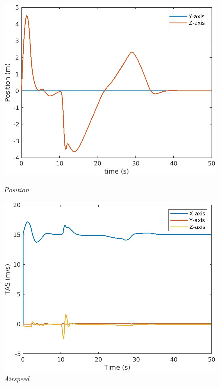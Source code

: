 \begin{figure}[htbp]
  \centering
  \begin{minipage}[b]{0.45\textwidth}
    \centering
    \includegraphics[width=\textwidth]{Images/Control Surface Analysis/1 position_1.jpg}
    \caption*{\textit{Position}}
  \end{minipage}
  \hfil
  \begin{minipage}[b]{0.45\textwidth}
    \centering
    \includegraphics[width=\textwidth]{Images/Control Surface Analysis/2 TAS_1.jpg}
    \caption*{\textit{Airspeed}}
  \end{minipage}

\end{figure}
